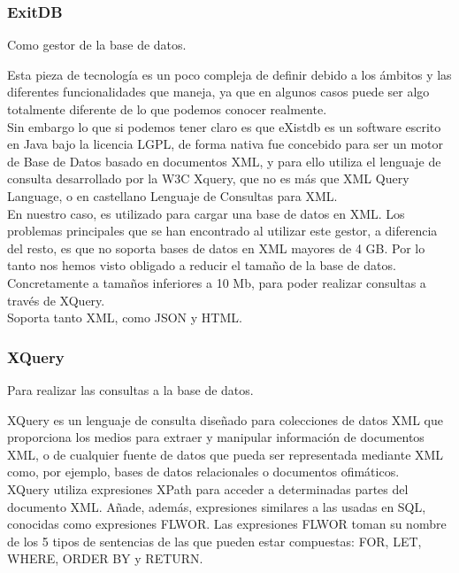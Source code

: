 \documentclass[12pt,a4paper]{article}
\begin{document}
\subsubsection{ExitDB} Como gestor de la base de datos. \label{pto412}

Esta pieza de tecnología es un poco compleja de definir debido a los ámbitos y las diferentes funcionalidades que maneja, ya que en algunos casos puede ser algo totalmente diferente de lo que podemos conocer realmente.\\

Sin embargo lo que si podemos tener claro es que eXistdb es un software escrito en Java bajo la licencia LGPL, de forma nativa fue concebido para ser un motor de Base de Datos basado en documentos XML, y para ello utiliza el lenguaje de consulta desarrollado por la W3C Xquery, que no es más que XML Query Language, o en castellano Lenguaje de Consultas para XML. \cite{cDB13}\\

En nuestro caso, es utilizado para cargar una base de datos en XML. Los problemas principales que se han encontrado al utilizar este gestor, a diferencia del resto, es que no soporta bases de datos en XML mayores de 4 GB. Por lo tanto nos hemos visto obligado a reducir el tamaño de la base de datos. Concretamente a tamaños inferiores a 10 Mb, para poder realizar consultas a través de XQuery.\\

Soporta tanto XML, como JSON y HTML.

\subsubsection{XQuery} Para realizar las consultas a la base de datos. \label{pto413}

XQuery es un lenguaje de consulta diseñado para colecciones de datos XML que proporciona los medios para extraer y manipular información de documentos XML, o de cualquier fuente de datos que pueda ser representada mediante XML como, por ejemplo, bases de datos relacionales o documentos ofimáticos. \\

XQuery utiliza expresiones XPath para acceder a determinadas partes del documento XML. Añade, además, expresiones similares a las usadas en SQL, conocidas como expresiones FLWOR. Las expresiones FLWOR toman su nombre de los 5 tipos de sentencias de las que pueden estar compuestas: FOR, LET, WHERE, ORDER BY y RETURN.\\
\end{document}
